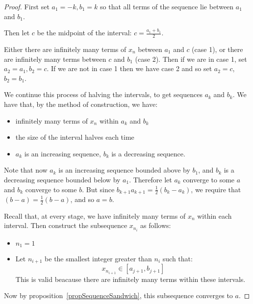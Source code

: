 \documentclass[../Main.tex]{subfiles}
\begin{document}
\begin{proof}
    First set $a_1 = -k, b_1 = k$ so that all terms of the sequence lie between $a_1$ and $b_1$.\par
    Then let $c$ be the midpoint of the interval: $c = \frac{a_1 + b_1}{2}$.\par
    Either there are infinitely many terms of $x_n$ between $a_1$ and $c$ (case 1), or there are infinitely many terms between $c$ and $b_1$ (case 2).
    Then if we are in case 1, set $a_2 = a_1, b_2 = c$. If we are not in case 1 then we have case 2 and so set $a_2 = c$, $b_2 = b_1$.\par
    We continue this process of halving the intervals, to get sequences $a_k$ and $b_k$. We have that, by the method of construction, we have:
    \begin{itemize}
        \item infinitely many terms of $x_n$ within $a_k$ and $b_k$
        \item the size of the interval halves each time
        \item $a_k$ is an increasing sequence, $b_k$ is a decreasing sequence.
    \end{itemize}
    Note that now $a_k$ is an increasing sequence bounded above by $b_1$, and $b_k$ is a decreasing sequence bounded below by $a_1$. Therefore let $a_k$ converge to some $a$ and $b_k$ converge to some $b$. But since $b_{k+1} a_{k + 1} = \frac{1}{2}(b_k - a_k)$, we require that $(b - a) = \frac{1}{2}(b - a)$, and so $a = b$.\par
    Recall that, at every stage, we have infinitely many terms of $x_n$ within each interval. Then construct the subsequence $x_{n_i}$ as follows:
    \begin{itemize}
        \item $n_1 = 1$
        \item Let $n_{i + 1}$ be the smallest integer greater than $n_i$ such that:
            \begin{equation*}
                x_{n_{i+1}} \in [a_{j + 1}, b_{j + 1}]
            \end{equation*}
            This is valid beacause there are infinitely many terms within these intervals.
    \end{itemize}
    Now by proposition~\ref{propSequenceSandwich}, this subsequence converges to $a$.
\end{proof}
\end{document}
